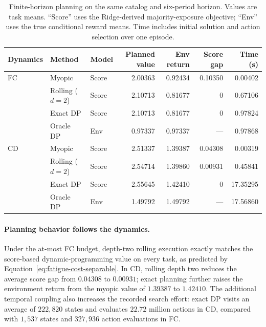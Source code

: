 \documentclass[a4paper,11pt]{article}
\numberwithin{equation}{section}
\begin{document}
\begin{table}[htbp]
\centering\small
\caption{Finite-horizon planning on the same catalog and six-period horizon. Values are task means. ``Score'' uses the Ridge-derived majority-exposure objective; ``Env'' uses the true conditional reward means. Time includes initial solution and action selection over one episode.}
\label{tab:planning-results}
\setlength{\tabcolsep}{4pt}
\begin{tabular*}{\textwidth}{@{\extracolsep{\fill}}lllrrrr@{}}
\toprule Dynamics & Method & Model & Planned value & Env return & Score gap & Time (s)\\\midrule
FC & Myopic & Score & 2.00363 & 0.92434 & 0.10350 & 0.00402\\
& Rolling ($d=2$) & Score & 2.10713 & 0.81677 & 0 & 0.67106\\
& Exact DP & Score & 2.10713 & 0.81677 & 0 & 0.97824\\
& Oracle DP & Env & 0.97337 & 0.97337 & --- & 0.97868\\\midrule
CD & Myopic & Score & 2.51337 & 1.39387 & 0.04308 & 0.00319\\
& Rolling ($d=2$) & Score & 2.54714 & 1.39860 & 0.00931 & 0.45841\\
& Exact DP & Score & 2.55645 & 1.42410 & 0 & 17.35295\\
& Oracle DP & Env & 1.49792 & 1.49792 & --- & 17.56860\\
\bottomrule
\end{tabular*}
\end{table}

\paragraph{Planning behavior follows the dynamics.}
Under the at-most FC budget, depth-two rolling execution exactly matches the score-based dynamic-programming value on every task, as predicted by Equation~\eqref{eq:fatigue-cost-separable}. In CD, rolling depth two reduces the average score gap from $0.04308$ to $0.00931$; exact planning further raises the environment return from the myopic value of $1.39387$ to $1.42410$. The additional temporal coupling also increases the recorded search effort: exact DP visits an average of $222{,}820$ states and evaluates $22.72$ million actions in CD, compared with $1{,}537$ states and $327{,}936$ action evaluations in FC.
\end{document}

